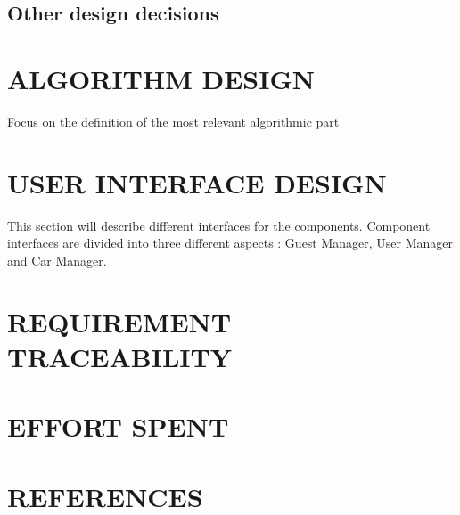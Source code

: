 \documentclass{article}
\begin{document}
	\subsection{Other design decisions}
	\newpage
	\section{ALGORITHM DESIGN}
	Focus on the definition of the most relevant algorithmic part
	\newpage
	\section{USER INTERFACE DESIGN}
	This section will describe different interfaces for the components. Component interfaces are divided into three different aspects : Guest Manager, User Manager and Car Manager.
	
	\newpage
	\section{REQUIREMENT TRACEABILITY}
	\newpage
	\section{EFFORT SPENT}
	\newpage
	\section{REFERENCES}
\end{document}
